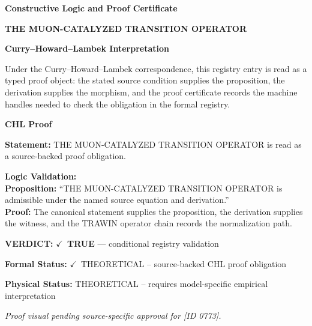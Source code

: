 \clearpage
\begingroup\tzpsupportsetup
\noindent\textbf{\fontsize{10.8pt}{12.8pt}\selectfont [ID 0773] Constructive Logic and Proof Certificate}\par
\noindent\textbf{\fontsize{10pt}{12pt}\selectfont THE MUON-CATALYZED TRANSITION OPERATOR}\par
\vspace{0.45em}
\begingroup
\footnotesize
\setlength{\parskip}{0.22em}
\setlength{\parindent}{0pt}
\noindent\textbf{Curry--Howard--Lambek Interpretation}\par
Under the Curry--Howard--Lambek correspondence, this registry entry is read as a typed proof
object: the stated source condition supplies the proposition, the derivation supplies the
morphism, and the proof certificate records the machine handles needed to check the obligation
in the formal registry.

\vspace{0.45em}
\noindent\textbf{CHL Proof}\par
\textbf{Statement:} THE MUON-CATALYZED TRANSITION OPERATOR is read as a source-backed proof obligation.

\textbf{Logic Validation:}\\
\textbf{Proposition:} ``THE MUON-CATALYZED TRANSITION OPERATOR is admissible under the named source equation and derivation.''\\
\textbf{Proof:} The canonical statement supplies the proposition, the derivation supplies the witness, and the TRAWIN operator chain records the normalization path.

\textbf{VERDICT:} \ensuremath{\checkmark}\ \textbf{TRUE} --- conditional registry validation

\textbf{Formal Status:} \ensuremath{\checkmark}\ THEORETICAL -- source-backed CHL proof obligation

\textbf{Physical Status:} THEORETICAL -- requires model-specific empirical interpretation
\par\vspace{0.45em}
\par
\vfill
\begingroup\footnotesize\itshape
Proof visual pending source-specific approval for [ID 0773].
\par\endgroup
\vfill
\endgroup
\endgroup

